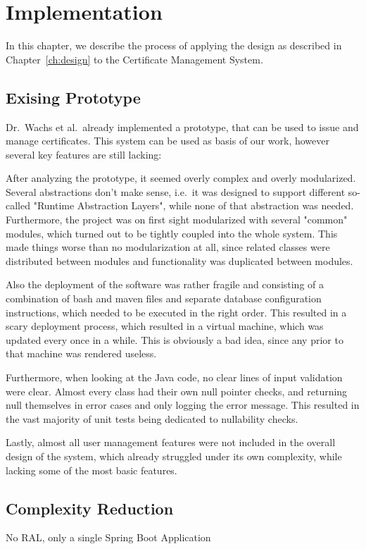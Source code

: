 \chapter{Implementation}\label{ch:implementation}
In this chapter, we describe the process of applying the design as described in Chapter~\ref{ch:design} to the
Certificate Management System.

\section{Exising Prototype}\label{sec:exisingPrototype}
Dr.\ Wachs et al.\ already implemented a prototype, that can be used to issue and manage certificates.
This system can be used as basis of our work, however several key features are still lacking:

After analyzing the prototype, it seemed overly complex and overly modularized.
Several abstractions don't make sense, i.e.\ it was designed to support different so-called "Runtime Abstraction
Layers", while none of that abstraction was needed.
Furthermore, the project was on first sight modularized with several "common" modules, which turned out to be tightly
coupled into the whole system.
This made things worse than no modularization at all, since related classes were distributed between modules and
functionality was duplicated between modules.

Also the deployment of the software was rather fragile and consisting of a combination of bash and maven files and
separate database configuration instructions, which needed to be executed in the right order.
This resulted in a scary deployment process, which resulted in a virtual machine, which was updated every once in a
while.
This is obviously a bad idea, since any  prior to that machine was rendered useless.

Furthermore, when looking at the Java code, no clear lines of input validation were clear.
Almost every class had their own null pointer checks, and returning null themselves in error cases and only logging the
error message.
This resulted in the vast majority of unit tests being dedicated to nullability checks.

Lastly, almost all user management features were not included in the overall design of the system, which already
struggled under its own complexity, while lacking some of the most basic features.

\section{Complexity Reduction}\label{sec:complexityReduction}
No RAL, only a single Spring Boot Application

